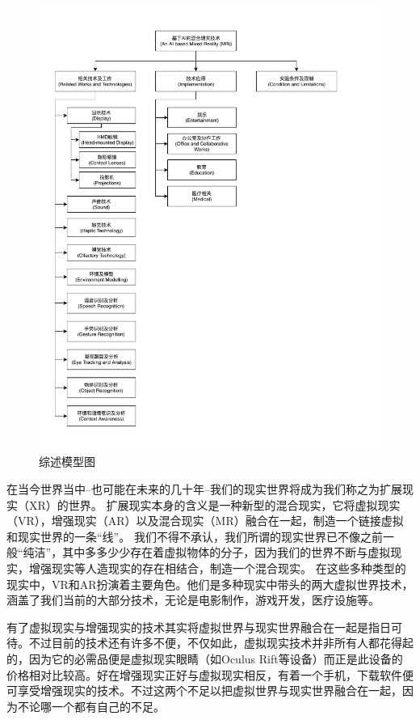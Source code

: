 \documentclass{llncs}
\begin{document}
\begin{figure}[h!]
	\centering
	\includegraphics[width=1\linewidth]{figures/summary}
	\caption{综述模型图}
	\label{fig:summary}
\end{figure}

在当今世界当中--也可能在未来的几十年--我们的现实世界将成为我们称之为扩展现实（XR）的世界。 扩展现实本身的含义是一种新型的混合现实，它将虚拟现实（VR），增强现实（AR）以及混合现实（MR）融合在一起，制造一个链接虚拟和现实世界的一条“线”\cite{mann2018all}。 我们不得不承认，我们所谓的现实世界已不像之前一般“纯洁”，其中多多少少存在着虚拟物体的分子，因为我们的世界不断与虚拟现实，增强现实等人造现实的存在相结合，制造一个混合现实。 在这些多种类型的现实中，VR和AR扮演着主要角色。他们是多种现实中带头的两大虚拟世界技术，涵盖了我们当前的大部分技术，无论是电影制作，游戏开发，医疗设施等。

有了虚拟现实与增强现实的技术其实将虚拟世界与现实世界融合在一起是指日可待。不过目前的技术还有许多不便，不仅如此，虚拟现实技术并非所有人都花得起的，因为它的必需品便是虚拟现实眼睛（如Oculus Rift等设备）而正是此设备的价格相对比较高。好在增强现实正好与虚拟现实相反，有着一个手机，下载软件便可享受增强现实的技术。不过这两个不足以把虚拟世界与现实世界融合在一起，因为不论哪一个都有自己的不足。
\end{document}
